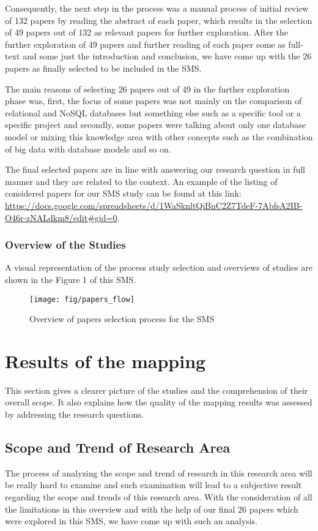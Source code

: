 \documentclass[sigconf,nonacm]{acmart}
\begin{document}
Consequently, the next step in the process was a manual process of initial review of 132 papers by reading the abstract of each paper, which results in the selection of 49 papers out of 132 as relevant papers for further exploration. After the further exploration of 49 papers and further reading of each paper some as full-text and some just the introduction and conclusion, we have come up with the 26 papers as finally selected to be included in the SMS.

The main reasons of selecting 26 papers out of 49 in the further exploration phase was, first, the focus of some papers was not mainly on the comparison of relational and NoSQL databases but something else such as a specific tool or a specific project and secondly, some papers were talking about only one database model or mixing this knowledge area with other concepts such as the combination of big data with database models and so on.
 
The final selected papers are in line with answering our research question in full manner and they are related to the context. An example of the listing of considered papers for our SMS study can be found at this link: 
\url{https://docs.google.com/spreadsheets/d/1WaSknltQiBnC2Z7TdeF-7AbfsA2IB-O46r-zNALdkm8/edit#gid=0}.

\subsubsection{\textbf{Overview of the Studies}}
 A visual representation of the process study selection and overviews of studies are shown in the Figure 1 of this SMS.

\begin{figure}[H]
  \centering
  \texttt{[image: fig/papers\_flow]}
  \caption{Overview of papers selection process for the SMS}
\end{figure}
 
\section{Results of the mapping}
This section gives a clearer picture of the studies and the comprehension of their overall scope. It also explains how the quality of the mapping results was assessed by addressing the research questions.


\subsection{Scope and Trend of Research Area}
The process of analyzing the scope and trend of research in this research area will be really hard to examine and such examination will lead to a subjective result regarding the scope and trends of this research area. With the consideration of all the limitations in this overview and with the help of our final 26 papers which were explored in this SMS, we have come up with such an analysis.
\end{document}
